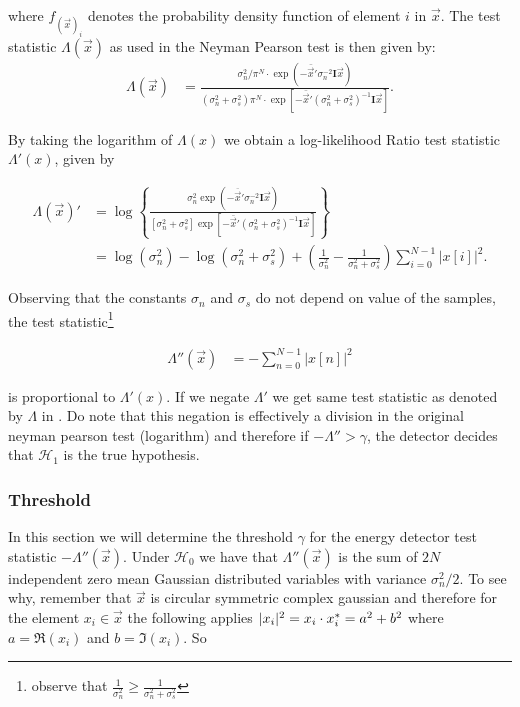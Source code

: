\documentclass[a4paper, openany, oneside]{memoir}
\begin{document}
where $f_{(\vec{x})_i}$ denotes the probability density function of element $i$ in $\vec{x}$.  The test statistic $\Lambda(\vec{x})$ as used in the Neyman Pearson test is then given by:
\begin{align*}
\Lambda(\vec{x}) &=\frac{\sigma_n^2/\pi^N \cdot \exp(-\bar{\vec{x}}'\sigma_n^{-2}\mathbf{I}\vec{x})}{(\sigma_n^2 + \sigma_s^2)\pi^N \cdot \exp[-\bar{\vec{x}}'(\sigma_n^2+\sigma_s^2)^{-1}\mathbf{I}\vec{x}]}.
\end{align*}


By taking the logarithm of $\Lambda(x)$ we obtain a log-likelihood Ratio test statistic $\Lambda'(x)$, given by

\begin{align}
\Lambda(\vec{x})' &= \log \left\{
\frac{\sigma_n^2\exp(-\overline{\vec{x}}'\sigma_n^{-2}\mathbf{I}\vec{x})}{[\sigma_n^2 + \sigma_s^2]\exp[-\bar{\vec{x}}'(\sigma_n^2+\sigma_s^2)^{-1}\mathbf{I}\vec{x}]}\right\} \\
&= \log(\sigma_n^2) - \log(\sigma_n^2 + \sigma_s^2) +  (\frac{1}{\sigma_n^2} - \frac{1}{\sigma_n^2 + \sigma_s^2 })\sum_{i=0}^{N-1} |x[i]|^2.  \nonumber
\end{align}

Observing that the constants $\sigma_n$ and $\sigma_s$ do not depend on value of the samples, the test statistic\footnote{observe that $\frac{1}{\sigma_n^2} \geq \frac{1}{\sigma_n^2+\sigma_s^2}$}

\begin{align*}
\Lambda''(\vec{x}) &= -\sum_{n=0}^{N-1} |x[n]|^2
\end{align*} 

is proportional to $\Lambda'(x)$. If we negate $\Lambda'$ we get same test statistic as denoted by $\Lambda$ in . Do note that
this negation is effectively a division in the original neyman pearson test (logarithm) and therefore if
$-\Lambda'' > \gamma$, the detector decides that $\mathcal{H}_1$ is the true hypothesis. 

\subsubsection{Threshold}
In this section we will determine the threshold $\gamma$ for the energy detector test statistic $-\Lambda''(\vec{x})$.
Under $\mathcal{H}_0$ we have that $\Lambda''(\vec{x})$ is the sum of $2N$ independent zero mean Gaussian distributed variables
with variance $\sigma_n^2/2$. To see why, remember that $\vec{x}$ is circular symmetric complex gaussian and therefore for the element $x_i \in \vec{x}$ the following applies
$|x_i|^2 = x_i \cdot x_i^* = a^2 + b^2$ where $a = \Re(x_i)$ and $b=\Im(x_i)$.  So
\end{document}
